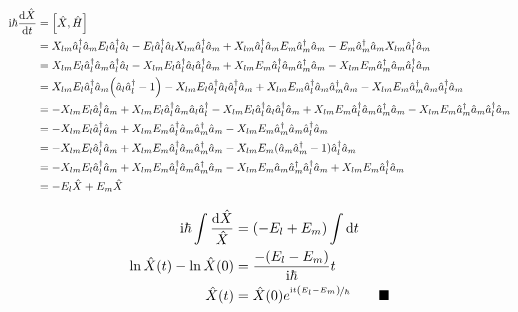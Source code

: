 \documentclass{article}
\begin{document}
\begin{align*}
\text{i}\hbar\dv{\hat{X} }{t}&= \qty[\hat{X} ,\hat{H}]\\
&=X_{lm}\hat{a}_l^\dagger\hat{a}_m E_{l}\hat{a}_l^\dagger\hat{a}_l-E_{l}\hat{a}_l^\dagger\hat{a}_l X_{lm}\hat{a}_l^\dagger\hat{a}_m + X_{lm}\hat{a}_l^\dagger\hat{a}_m E_{m}\hat{a}_m^\dagger\hat{a}_m-E_{m}\hat{a}_m^\dagger\hat{a}_m X_{lm}\hat{a}_l^\dagger\hat{a}_m \\
&=X_{lm}E_{l}\hat{a}_l^\dagger\hat{a}_m \hat{a}_l^\dagger\hat{a}_l-X_{lm}E_{l}\hat{a}_l^\dagger\hat{a}_l \hat{a}_l^\dagger\hat{a}_m + X_{lm}E_{m}\hat{a}_l^\dagger\hat{a}_m \hat{a}_m^\dagger\hat{a}_m-X_{lm}E_{m}\hat{a}_m^\dagger\hat{a}_m \hat{a}_l^\dagger\hat{a}_m \\
&=X_{lm}E_{l}\hat{a}_l^\dagger\hat{a}_m \qty(\hat{a}_l\hat{a}_l^\dagger-1)-X_{lm}E_{l}\hat{a}_l^\dagger\hat{a}_l \hat{a}_l^\dagger\hat{a}_m + X_{lm}E_{m}\hat{a}_l^\dagger\hat{a}_m \hat{a}_m^\dagger\hat{a}_m-X_{lm}E_{m}\hat{a}_m^\dagger\hat{a}_m \hat{a}_l^\dagger\hat{a}_m \\
&=-X_{lm}E_{l}\hat{a}_l^\dagger\hat{a}_m+X_{lm}E_{l}\hat{a}_l^\dagger\hat{a}_m \hat{a}_l\hat{a}_l^\dagger-X_{lm}E_{l}\hat{a}_l^\dagger\hat{a}_l \hat{a}_l^\dagger\hat{a}_m + X_{lm}E_{m}\hat{a}_l^\dagger\hat{a}_m \hat{a}_m^\dagger\hat{a}_m-X_{lm}E_{m}\hat{a}_m^\dagger\hat{a}_m \hat{a}_l^\dagger\hat{a}_m \\
&=-X_{lm}E_{l}\hat{a}_l^\dagger\hat{a}_m + X_{lm}E_{m}\hat{a}_l^\dagger\hat{a}_m \hat{a}_m^\dagger\hat{a}_m-X_{lm}E_{m}\hat{a}_m^\dagger\hat{a}_m \hat{a}_l^\dagger\hat{a}_m \\
&=-X_{lm}E_{l}\hat{a}_l^\dagger\hat{a}_m + X_{lm}E_{m}\hat{a}_l^\dagger\hat{a}_m \hat{a}_m^\dagger\hat{a}_m-X_{lm}E_{m}(\hat{a}_m\hat{a}_m^\dagger-1) \hat{a}_l^\dagger\hat{a}_m \\
&=-X_{lm}E_{l}\hat{a}_l^\dagger\hat{a}_m + X_{lm}E_{m}\hat{a}_l^\dagger\hat{a}_m \hat{a}_m^\dagger\hat{a}_m-X_{lm}E_{m}\hat{a}_m \hat{a}_m^\dagger \hat{a}_l^\dagger \hat{a}_m+ X_{lm}E_{m}\hat{a}_l^\dagger\hat{a}_m \\
&=-E_{l}\hat{X}+E_{m}\hat{X}
\end{align*}

\begin{align*}
\text{i}\hbar\int\frac{\dd{\hat{X}}}{\hat{X}}&=\qty(-E_{l}+E_{m})\int\dd{t} \\
\ln{\hat{X}(t)}-\ln{\hat{X}(0)}&=\frac{-\qty(E_{l}-E_{m})}{\text{i}\hbar}t \\
\hat{X}(t)&=\hat{X}(0)e^{\nicefrac{\text{i}t\qty(E_{l}-E_{m})}{\hbar}}\qquad\blacksquare 
\end{align*}
\end{document}
